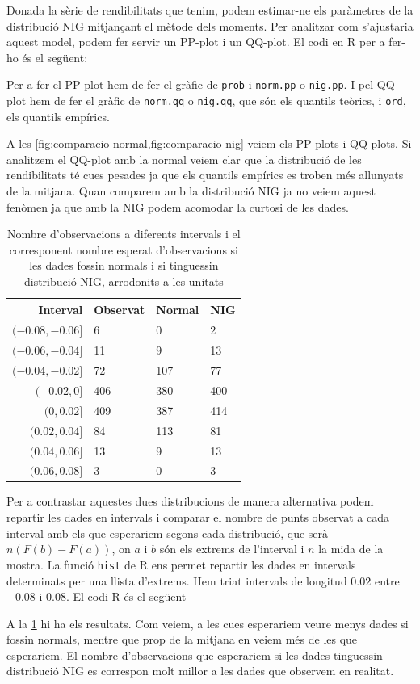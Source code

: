 \documentclass{article}
\numberwithin{table}{section}
\numberwithin{figure}{section}
\numberwithin{equation}{section}
\begin{document}
Donada la sèrie de rendibilitats que tenim, podem estimar-ne els paràmetres de la distribució NIG mitjançant el mètode dels moments. Per analitzar com s'ajustaria aquest model, podem fer servir un PP-plot i un QQ-plot. El codi en \textsf{R} per a fer-ho és el següent:  

Per a fer el PP-plot hem de fer el gràfic de \texttt{prob} i \texttt{norm.pp} o \texttt{nig.pp}. I pel QQ-plot hem de fer el gràfic de \texttt{norm.qq} o \texttt{nig.qq}, que són els quantils teòrics, i \texttt{ord}, els quantils empírics. 

A les \cref{fig:comparacio normal,fig:comparacio nig} veiem els PP-plots i QQ-plots. Si analitzem el QQ-plot amb la normal veiem clar que la distribució de les rendibilitats té cues pesades ja que els quantils empírics es troben més allunyats de la mitjana. Quan comparem amb la distribució NIG ja no veiem aquest fenòmen ja que amb la NIG podem acomodar la curtosi de les dades.

\begin{table}[htb]
	\centering \sffamily \small
	\caption{Nombre d'observacions a diferents intervals i el corresponent nombre esperat d'observacions si les dades fossin normals i si tinguessin distribució NIG, arrodonits a les unitats}
	\label{tab:intervals}
	\begin{tabular}{@{}rlll@{}}
		\toprule 
		Interval & Observat & Normal & NIG \\
		\midrule
 		\( (-0.08,-0.06] \) & 6 &   0 &   2 \\
 		\( (-0.06,-0.04] \) & 11 &   9 &  13 \\
 		\( (-0.04,-0.02] \) & 72 & 107 &  77 \\
		\( (-0.02, 0] \) & 406 & 380 & 400 \\
		\( (0, 0.02] \) & 409 & 387 & 414 \\
 		\( (0.02, 0.04] \) & 84 & 113 &  81 \\
 		\( (0.04, 0.06] \) & 13 &   9 &  13 \\
  	\( (0.06, 0.08] \) & 3 &   0 &   3 \\
		\bottomrule 
	\end{tabular}
\end{table}

Per a contrastar aquestes dues distribucions de manera alternativa podem repartir les dades en intervals i comparar el nombre de punts observat a cada interval amb els que esperariem segons cada distribució, que serà \( n (F(b) - F(a)) \), on \( a \) i \( b \) són els extrems de l'interval i \( n \) la mida de la mostra. La funció \texttt{hist} de \textsf{R} ens permet repartir les dades en intervals determinats per una llista d'extrems. Hem triat intervals de longitud \( 0.02 \) entre \( -0.08 \) i \( 0.08 \). El codi \textsf{R} és el següent

A la \cref{tab:intervals} hi ha els resultats. Com veiem, a les cues esperariem veure menys dades si fossin normals, mentre que prop de la mitjana en veiem més de les que esperariem. El nombre d'observacions que esperariem si les dades tinguessin distribució NIG es correspon molt millor a les dades que observem en realitat.
\end{document}
